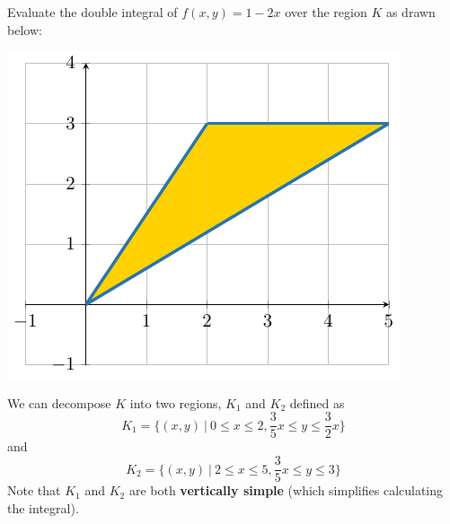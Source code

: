 \begin{example}
    Evaluate the double integral of $f(x,y) = 1-2x$ over the region $K$ as drawn below:

    \begin{center}
        \includegraphics{chapters/4-IntegrationRn/figures/figures-decomposek.pdf}
    \end{center}

    We can decompose $K$ into two regions, $K_1$ and $K_2$ defined as $$K_1 = \{(x,y) \ | \ 0 \leq x \leq 2, \frac{3}{5}x \leq y \leq \frac{3}{2}x\}$$ and 
    $$K_2 = \{(x,y) \ | \ 2 \leq x \leq 5, \frac{3}{5}x \leq y \leq 3 \}$$  
    Note that $K_1$ and $K_2$ are both \textbf{vertically simple} (which simplifies calculating the integral). 


\end{example}
